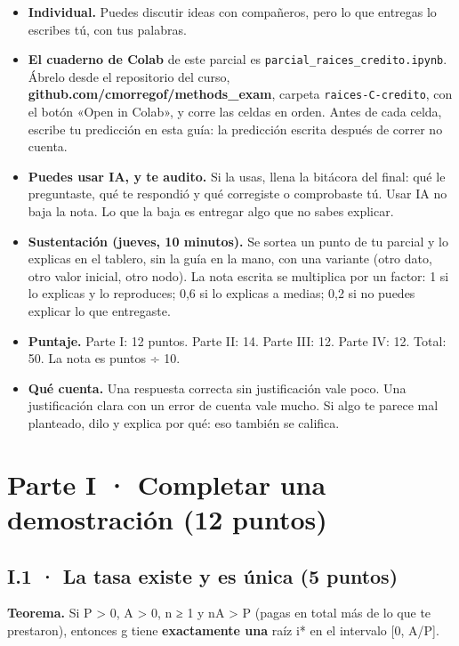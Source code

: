 \begin{itemize}
\tightlist
\item
  \textbf{Individual.} Puedes discutir ideas con compañeros, pero lo que entregas lo escribes tú, con tus palabras.
\item
  \textbf{El cuaderno de Colab} de este parcial es \texttt{parcial\_raices\_credito.ipynb}. Ábrelo desde el repositorio del curso, \textbf{github.com/cmorregof/methods\_exam}, carpeta \texttt{raices-C-credito}, con el botón «Open in Colab», y corre las celdas en orden. Antes de cada celda, escribe tu predicción en esta guía: la predicción escrita después de correr no cuenta.
\item
  \textbf{Puedes usar IA, y te audito.} Si la usas, llena la bitácora del final: qué le preguntaste, qué te respondió y qué corregiste o comprobaste tú. Usar IA no baja la nota. Lo que la baja es entregar algo que no sabes explicar.
\item
  \textbf{Sustentación (jueves, 10 minutos).} Se sortea un punto de tu parcial y lo explicas en el tablero, sin la guía en la mano, con una variante (otro dato, otro valor inicial, otro nodo). La nota escrita se multiplica por un factor: 1 si lo explicas y lo reproduces; 0,6 si lo explicas a medias; 0,2 si no puedes explicar lo que entregaste.
\item
  \textbf{Puntaje.} Parte I: 12 puntos. Parte II: 14. Parte III: 12. Parte IV: 12. Total: 50. La nota es puntos ÷ 10.
\item
  \textbf{Qué cuenta.} Una respuesta correcta sin justificación vale poco. Una justificación clara con un error de cuenta vale mucho. Si algo te parece mal planteado, dilo y explica por qué: eso también se califica.
\end{itemize}

\section{Parte I · Completar una demostración (12 puntos)}

\subsection{I.1 · La tasa existe y es única (5 puntos)}

\textbf{Teorema.} Si P \textgreater{} 0, A \textgreater{} 0, n ≥ 1 y nA \textgreater{} P (pagas en total más de lo que te prestaron), entonces g tiene \textbf{exactamente una} raíz i* en el intervalo {[}0, A/P{]}.

